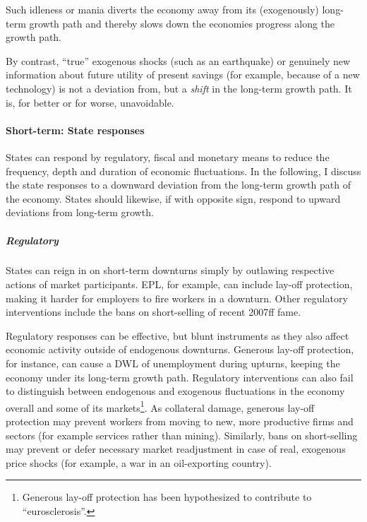 Such idleness or mania diverts the economy away from its (exogenously) long-term growth path and thereby slows down the economies progress along the growth path.

By contrast, ``true'' exogenous shocks (such as an earthquake) or genuinely new information about future utility of present savings (for example, because of a new technology) is not a deviation from, but a \emph{shift} in the long-term growth path. It is, for better or for worse, unavoidable.

\paragraph{Short-term: State responses}
States can respond by regulatory, fiscal and monetary means to reduce the frequency, depth and duration of economic fluctuations. In the following, I discuss the state responses to a downward deviation from the long-term growth path of the economy. States should likewise, if with opposite sign, respond to upward deviations from long-term growth.

\subparagraph{Regulatory}
States can reign in on short-term downturns simply by outlawing respective actions of market participants. \gls{EPL}, for example, can include lay-off protection, making it harder for employers to fire workers in a downturn. Other regulatory interventions include the bans on short-selling of recent 2007ff fame. %

Regulatory responses can be effective, but blunt instruments as they also affect economic activity outside of endogenous downturns. Generous lay-off protection, for instance, can cause a \gls{DWL} of unemployment during upturns, keeping the economy under its long-term growth path. Regulatory interventions can also fail to distinguish between endogenous and exogenous fluctuations in the economy overall and some of its markets\footnote{
	Generous lay-off protection has been hypothesized to contribute to ``eurosclerosis''.}. %
As collateral damage, generous lay-off protection may prevent workers from moving to new, more productive firms and sectors (for example services rather than mining). Similarly, bans on short-selling may prevent or defer necessary market readjustment in case of real, exogenous price shocks (for example, a war in an oil-exporting country).

